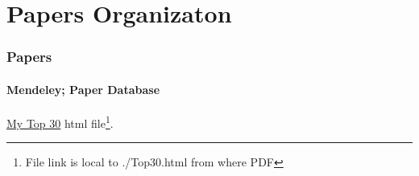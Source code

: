 \section{Papers Organizaton}

\begin{frame}
    \frametitle{Papers}
    \framesubtitle{Mendeley; Paper Database}

	\href{run:./Top30.html}{My Top 30} html file\footnote{File link is local to ./Top30.html from where PDF}. 	

\end{frame}

